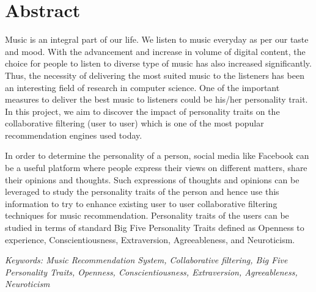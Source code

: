 


\newpage
\section*{Abstract}
Music is an integral part of our life. We listen to music everyday as per our taste and mood. With the advancement and increase in volume of digital content, the choice for people to listen to diverse type of music has also increased significantly. Thus, the necessity of delivering the most suited music to the listeners has been an interesting field of research in computer science. One of the important measures to deliver the best music to listeners could be his/her personality trait. In this project, we aim to discover the impact of personality traits on the collaborative filtering (user to user) which is one of the most popular recommendation engines used today.

In order to determine the personality of a person, social media like Facebook can be a useful platform where people express their views on different matters, share their opinions and thoughts. Such expressions of thoughts and opinions can be leveraged to study the personality traits of the person and hence use this information to try to enhance existing user to user collaborative filtering techniques for music recommendation. Personality traits of the users can be studied in terms of standard Big Five Personality Traits defined as Openness to experience, Conscientiousness, Extraversion, Agreeableness, and Neuroticism.

{\em Keywords: Music Recommendation System, Collaborative filtering, Big Five Personality Traits, Openness, Conscientiousness, Extraversion, Agreeableness, Neuroticism}